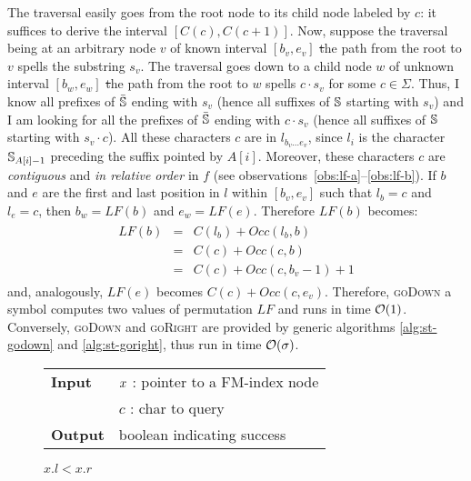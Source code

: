 The traversal easily goes from the root node to its child node labeled by $c$: it suffices to derive the interval $[C(c),C(c+1)]$.
Now, suppose the traversal being at an arbitrary node $v$ of known interval $[b_v, e_v]$ \st the path from the root to $v$ spells the substring $s_v$.
The traversal goes down to a child node $w$ of unknown interval $[b_w, e_w]$ \st the path from the root to $w$ spells $c \cdot s_v$ for some $c \in \Sigma$.
Thus, I know all prefixes of $\bar{\mathbb {S}}$ ending with $s_v$ (hence all suffixes of $\mathbb {S}$ starting with $s_v$) and I am looking for all the prefixes of $\bar{\mathbb {S}}$ ending with $c \cdot s_v$ (hence all suffixes of $\mathbb {S}$ starting with $s_v \cdot c$).
All these characters $c$ are in $l_{b_v \dots e_v}$, since $l_i$ is the character $\mathbb {S}_{A[i] - 1}$ preceding the suffix pointed by $A[i]$.
Moreover, these characters $c$ are \emph{contiguous} and \emph{in relative order} in $f$ (see observations~\ref{obs:lf-a}--\ref{obs:lf-b}).
If $b$ and $e$ are the first and last position in $l$ within $[b_v, e_v]$ such that $l_b = c$ and $l_e = c$, then $b_w = LF(b)$ and $e_w = LF(e)$.
Therefore $LF(b)$ becomes:
\begin{eqnarray}
\begin{array}{lcl}
LF(b) &=& C(l_b) + Occ(l_b, b)\\
 	  &=& C(c) + Occ(c, b)\\
	  &=& C(c) + Occ(c, b_v - 1) + 1
\end{array}
\end{eqnarray}
and, analogously, $LF(e)$ becomes $C(c) + Occ(c, e_v)$.
Therefore, \textsc{goDown} a symbol computes two values of permutation $LF$ and runs in time $\mathcal{O}(1)$.
Conversely, \textsc{goDown} and \textsc{goRight} are provided by generic algorithms \ref{alg:st-godown} and \ref{alg:st-goright}, thus run in time $\mathcal{O}(\sigma)$.

\begin{figure*}
\begin{center}
\begin{minipage}[t]{.5\textwidth}
\begin{algorithm}[H]
\begin{tabular}{ll}
\textbf{Input}  & $x$ : pointer to a FM-index node\\
				& $c$ : char to query\\
\textbf{Output} & boolean indicating success\\
\end{tabular}
\begin{algorithmic}[1]
	\State \Return \False
\EndIf
{}
\State \Return $x.l < x.r$
\end{algorithmic}
\label{alg:fm-godownc}
\end{algorithm}
\end{minipage}
\end{center}
\end{figure*}

